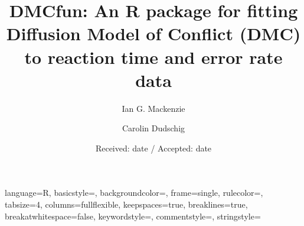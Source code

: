 \newenvironment{knitrout}{}{} %

\usepackage{alltt}  %

\usepackage{tempora}  %
\usepackage{graphicx}
\usepackage{color}
\usepackage{float}
\usepackage{listings}
\usepackage{longtable}
\usepackage[style=apa, sortcites=true, sorting=nyt,backend=biber]{biblatex}






{
  language=R,
  basicstyle=\small\ttfamily,
  backgroundcolor=\color{white},
  frame=single,
  rulecolor=\color{black},
  tabsize=4,
  columns=fullflexible,
  keepspaces=true,
  breaklines=true,
  breakatwhitespace=false,
  keywordstyle=\color{black},
  commentstyle=\color{dkgreen},
  stringstyle=\color{black}
}


\title{DMCfun: An R package for fitting Diffusion Model of Conflict (DMC) to reaction time and error rate data}
\subtitle{}

\author{Ian G. Mackenzie \and
    Carolin Dudschig
}


\date{Received: date / Accepted: date}
\maketitle

